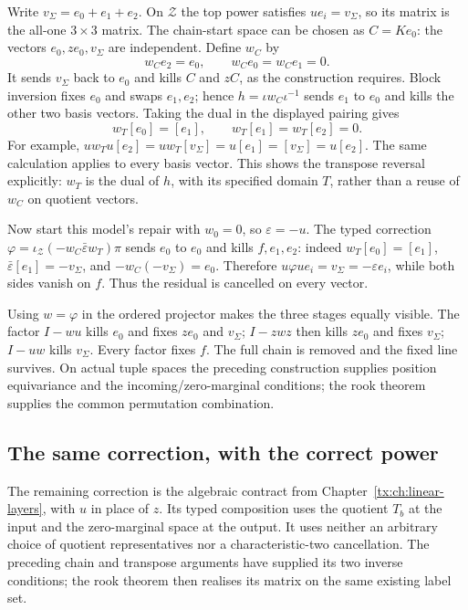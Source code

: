 Write $v_{\Sigma}=e_0+e_1+e_2$. On $\mathcal Z$ the top power satisfies
$ue_i=v_{\Sigma}$, so its matrix is the all-one $3\times3$ matrix. The
chain-start space can be chosen as $C=Ke_0$: the vectors
$e_0,ze_0,v_{\Sigma}$ are independent. Define $w_C$ by
\[
 w_Ce_2=e_0,\qquad w_Ce_0=w_Ce_1=0.
\]
It sends $v_{\Sigma}$ back to $e_0$ and kills $C$ and $zC$, as the construction
requires. Block inversion fixes $e_0$ and swaps $e_1,e_2$; hence
$h=\iota w_C\iota^{-1}$ sends $e_1$ to $e_0$ and kills the other
two basis vectors. Taking the dual in the displayed pairing gives
\[
 w_T[e_0]=[e_1],\qquad w_T[e_1]=w_T[e_2]=0.
\]
For example, $uw_Tu[e_2]=uw_T[v_{\Sigma}]=u[e_1]=[v_{\Sigma}]=u[e_2]$.
The same calculation applies to every basis vector. This shows the
transpose reversal explicitly: $w_T$ is the dual of $h$, with its
specified domain $T$, rather than a reuse of $w_C$ on quotient vectors.

Now start this model's repair with $w_0=0$, so $\varepsilon=-u$.
The typed correction
$\varphi=\iota_{\mathcal Z}(-w_C\bar\varepsilon w_T)\pi$
sends $e_0$ to $e_0$ and kills $f,e_1,e_2$: indeed $w_T[e_0]=[e_1]$,
$\bar\varepsilon[e_1]=-v_{\Sigma}$, and $-w_C(-v_{\Sigma})=e_0$.
Therefore $u\varphi ue_i=v_{\Sigma}=-\varepsilon e_i$, while both sides
vanish on $f$. Thus the residual is cancelled on every vector.

Using $w=\varphi$ in the ordered projector makes the three stages
equally visible. The factor $I-wu$ kills $e_0$ and fixes $ze_0$ and
$v_{\Sigma}$; $I-zwz$ then kills $ze_0$ and fixes $v_{\Sigma}$; $I-uw$ kills $v_{\Sigma}$.
Every factor fixes $f$. The full chain is removed and the fixed line
survives. On actual tuple spaces the preceding construction supplies
position equivariance and the incoming/zero-marginal conditions;
the rook theorem supplies the common permutation combination.

\subsection{The same correction, with the correct power}
The remaining correction is the algebraic contract from
Chapter~\ref{tx:ch:linear-layers}, with $u$ in place of $z$.
Its typed composition uses the quotient $T_b$ at the input and the
zero-marginal space at the output. It uses neither an arbitrary choice
of quotient representatives nor a characteristic-two cancellation.
The preceding chain and transpose arguments have supplied its two
inverse conditions; the rook theorem then realises its matrix on the
same existing label set.

